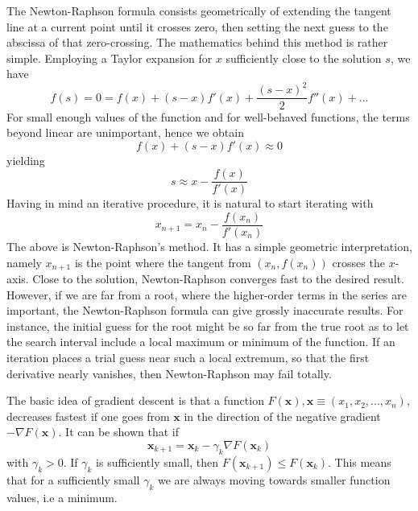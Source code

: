 \documentclass[a4paper, 10pt, english]{revtex4-2} %
\begin{document}
        The Newton-Raphson formula consists geometrically of extending the tangent line at a current point until it crosses zero, then setting the next guess to the abscissa of that zero-crossing. The mathematics behind this method is rather simple. Employing a Taylor expansion for $x$ sufficiently close to the solution $s$, we have
        \begin{equation}
                f(s)
            =   0
            =   f(x) + (s - x)f'(x) + \frac{(s - x)^2}{2}f''(x) + ...
        \end{equation}
        For small enough values of the function and for well-behaved functions, the terms beyond linear are unimportant, hence we obtain
        \begin{equation}
                f(x) + (s - x)f'(x)
            \approx
                0
        \end{equation}
        yielding
        \begin{equation}
                s 
            \approx
                x - \frac{f(x)}{f'(x)}
        \end{equation}
        Having in mind an iterative procedure, it is natural to start iterating with
        \begin{equation}
                x_{n+1}
            =   x_n - \frac{f(x_n)}{f'(x_n)}
        \end{equation}
        The above is Newton-Raphson's method. It has a simple geometric interpretation, namely $x_{n+1}$ is the point where the tangent from $(x_n, f(x_n))$ crosses the $x$-axis. 
        Close to the solution, Newton-Raphson converges fast to the desired result. However, if we are far from a root, where the higher-order terms in the series are important, the Newton-Raphson formula can give grossly inaccurate results. 
        For instance, the initial guess for the root might be so far from the true root as to let the search interval include a local maximum or minimum of the function. 
        If an iteration places a trial guess near such a local extremum, so that the first derivative nearly vanishes, then Newton-Raphson may fail totally.


        The basic idea of gradient descent is that a function $F(\mathbf{x}), \mathbf{x} \equiv (x_1, x_2, ..., x_n)$, decreases fastest if one goes from $\mathbf{x}$ in the direction of the negative gradient $-\nabla F(\mathbf{x})$.
        It can be shown that if
        \begin{equation}
                \mathbf{x}_{k+1}
            =   \mathbf{x}_k - \gamma_k\nabla F(\mathbf{x}_k)
        \end{equation}
        with $\gamma_k > 0$.
        If $\gamma_k$ is sufficiently small, then $F(\mathbf{x}_{k+1}) \leq F(\mathbf{x}_k)$. 
        This means that for a sufficiently small $\gamma_k$ we are always moving towards smaller function values, i.e a minimum.
\end{document}
